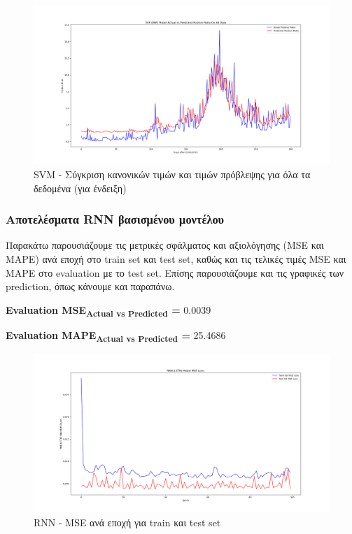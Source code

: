 \documentclass[12pt,a4paper]{article}
\begin{document}
\begin{figure}[H]
	\includegraphics[width=\textwidth]{Figures/Question3/2. SVR Actual vs Predicted All Data.png}
	\caption{SVM - Σύγκριση κανονικών τιμών και τιμών πρόβλεψης για όλα τα δεδομένα (για ένδειξη)}
\end{figure}

\subsubsection{Αποτελέσματα RNN βασισμένου μοντέλου}

Παρακάτω παρουσιάζουμε τις μετρικές σφάλματος και αξιολόγησης (MSE και MAPE) ανά εποχή στο train set και test set, καθώς και τις τελικές τιμές MSE και MAPE στο evaluation με το test set. Επίσης παρουσιάζουμε και τις γραφικές των prediction, όπως κάνουμε και παραπάνω.

\textbf{Evaluation MSE\textsubscript{Actual vs Predicted} =} 0.0039

\textbf{Evaluation MAPE\textsubscript{Actual vs Predicted} =} 25.4686

\begin{figure}[H]
	\includegraphics[width=\textwidth]{Figures/Question3/3. RNN Model MSE Loss.png}
	\caption{RNN - MSE ανά εποχή για train και test set}
\end{figure}
\end{document}
